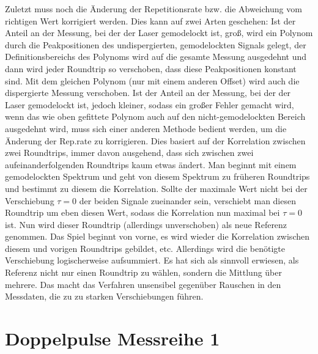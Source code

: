 \documentclass[bachelor,       %
               twoside,        %
               BCOR10mm,       %
               english,ngerman, %
               ]{GAUBM}
\begin{document}
Zuletzt muss noch die Änderung der Repetitionsrate bzw. die Abweichung vom richtigen Wert korrigiert werden.
Dies kann auf zwei Arten geschehen:
Ist der Anteil an der Messung, bei der der Laser gemodelockt ist, groß, wird ein Polynom durch die Peakpositionen des undispergierten, gemodelockten Signals gelegt, der Definitionsbereichs des Polynoms wird auf die gesamte Messung ausgedehnt und dann wird jeder Roundtrip so verschoben, dass diese Peakpositionen konstant sind.
Mit dem gleichen Polynom (nur mit einem anderen Offset) wird auch die dispergierte Messung verschoben.
Ist der Anteil an der Messung, bei der der Laser gemodelockt ist, jedoch kleiner, sodass ein großer Fehler gemacht wird, wenn das wie oben gefittete Polynom auch auf den nicht-gemodelockten Bereich ausgedehnt wird, muss sich einer anderen Methode bedient werden, um die Änderung der Rep.rate zu korrigieren.
Dies basiert auf der Korrelation zwischen zwei Roundtrips, immer davon ausgehend, dass sich zwischen zwei aufeinanderfolgenden Roundtrips kaum etwas ändert.
Man beginnt mit einem gemodelockten Spektrum und geht von diesem Spektrum zu früheren Roundtrips und bestimmt zu diesem die Korrelation.
Sollte der maximale Wert nicht bei der Verschiebung $\tau=0$ der beiden Signale zueinander sein, verschiebt man diesen Roundtrip um eben diesen Wert, sodass die Korrelation nun maximal bei $\tau=0$ ist.
Nun wird dieser Roundtrip (allerdings unverschoben) als neue Referenz genommen.
Das Spiel beginnt von vorne, es wird wieder die Korrelation zwischen diesem und vorigen Roundtrips gebildet, etc.
Allerdings wird die benötigte Verschiebung logischerweise aufsummiert.
Es hat sich als sinnvoll erwiesen, als Referenz nicht nur einen Roundtrip zu wählen, sondern die Mittlung über mehrere.
Das macht das Verfahren unsensibel gegenüber Rauschen in den Messdaten, die zu zu starken Verschiebungen führen.

\section{Doppelpulse Messreihe 1}
\end{document}
